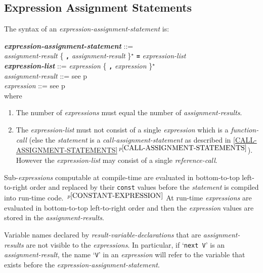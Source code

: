 \documentclass[12pt]{article}
\newcommand{\TT}[1]{{\tt \bfseries #1}}
\newcommand{\STAR}{{\Large $^\star$}}
\newcommand{\emkey}[1]{{\em \bfseries #1}}
\newcommand{\itemref}[1]{\ref{#1}$\,^{p\pageref{#1}}$}
\newcommand{\pagref}[1]{p\pageref{#1}}
\newcommand{\pagnote}[1]{$\,^{p\pageref{#1}}$}
\newenvironment{indpar}[1][0.3in]%
	{\begin{list}{}%
		     {\setlength{\itemsep}{0in}%
		      \setlength{\topsep}{0in}%
		      \setlength{\parsep}{1ex}%
		      \setlength{\labelwidth}{#1}%
		      \setlength{\leftmargin}{#1}%
		      \addtolength{\leftmargin}{\labelsep}}%
	 \item}%
	{\end{list}}
\begin{document}
\subsection{Expression Assignment Statements}
\label{EXPRESSION-ASSIGNMENT-STATEMENTS}

The syntax of an {\em expression-assign\-ment-statement} is:
\begin{indpar}
\emkey{expression-assignment-statement} ::= \\
\hspace*{0.5in} {\em assignment-result}
                \{ \TT{,} {\em assignment-result} \}\STAR{}
		\TT{=} {\em expression-list}
\\[0.5ex]
\emkey{expression-list}\label{EXPRESSION-LIST} ::=
	      {\em expression} \{ \TT{,} {\em expression} \}\STAR{}
\\[0.5ex]
{\em assignment-result} ::= see \pagref{ASSIGNMENT-RESULT}
\\[0.5ex]
{\em expression} ::= see \pagref{EXPRESSION}
\\[2.0ex]
where
\begin{enumerate}

\item The number of {\em expressions} must equal the number
of {\em assignment-results}.

\item The {\em expression-list} must not consist of a single
{\em expression} which is a {\em function-call} (else the
{\em statement} is a {\em call-assignment-statement} as described in
\itemref{CALL-ASSIGNMENT-STATEMENTS}).  However the {\em expression-list}
may consist of a single {\em reference-call}.

\end{enumerate}
\end{indpar}

Sub-{\em expressions} computable at compile-time are evaluated
in bottom-to-top left-to-right order and replaced by their {\tt const} values
before the {\em statement} is compiled into run-time code.%
\pagnote{CONSTANT-EXPRESSION}
At run-time {\em expressions} are evaluated in bottom-to-top
left-to-right order and
then the {\em expression} values are stored in the {\em assignment-results}.

Variable names declared by {\em result-variable-declarations} that are
{\em assignment-results} are not visible to the {\em expressions}.
In particular, if `{\tt next V}' is an {\em assignment-result},
the name `{\tt V}' in an {\em expression} will refer to the variable
that exists before the {\em expression-assignment-statement}.
\end{document}
